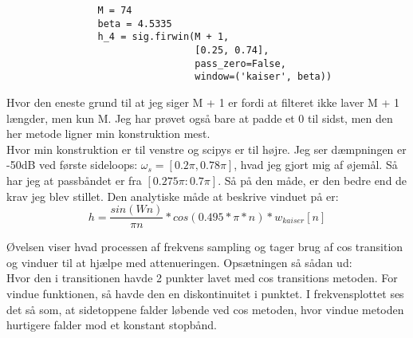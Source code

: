 \begin{Øvelser}
\begin{kapitel}
\begin{Øvelse}
            \begin{verbatim}
                M = 74 
                beta = 4.5335
                h_4 = sig.firwin(M + 1,
                                 [0.25, 0.74],
                                 pass_zero=False,
                                 window=('kaiser', beta))
            \end{verbatim} 
            Hvor den eneste grund til at jeg siger M + 1 er fordi at filteret ikke laver M + 1 længder, men kun M. 
            Jeg har prøvet også bare at padde et 0 til sidst, men den her metode ligner min konstruktion mest. 
            \\
            Hvor min konstruktion er til venstre og scipys er til højre. 
            Jeg ser dæmpningen er -50dB ved første sideloops: $\omega_s = [0.2\pi, 0.78\pi]$, hvad jeg gjort mig af øjemål. 
            Så har jeg at passbåndet er fra $[0.275\pi : 0.7\pi]$. 
            Så på den måde, er den bedre end de krav jeg blev stillet. 
            Den analytiske måde at beskrive vinduet på er: 
            \[h =  \frac{sin(W n)}{\pi n} * cos(0.495*\pi * n) * w_{kaiser}[n]\]
        \end{Øvelse}\clearpage
        
        \begin{Øvelse}
            Øvelsen viser hvad processen af frekvens sampling og tager brug af cos transition og vinduer til at hjælpe med attenueringen. 
            Opsætningen så sådan ud: 
            \\
            Hvor den i transitionen havde 2 punkter lavet med cos transitions metoden. 
            For vindue funktionen, så havde den en diskontinuitet i punktet. 
            I frekvensplottet ses det så som, at sidetoppene falder løbende ved cos metoden, 
            hvor vindue metoden hurtigere falder mod et konstant stopbånd.

        \end{Øvelse}        
    \end{kapitel}
    
\end{Øvelser}